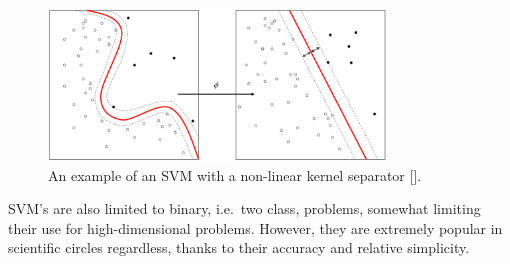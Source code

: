 \begin{figure}
  \centering
  \includegraphics[width=0.8\textwidth]{figures/chapter2/svm_nonlinear}
  \caption[An example of an SVM with a non-linear kernel separator.]{An example of an SVM with a non-linear kernel separator [\cite{kernel-wiki-pic}].}
\label{fig:chap2-svm-nonlinear}
\end{figure}

SVM's are also limited to  binary, i.e.\ two class, problems, somewhat limiting their use for high-dimensional problems. However, they are extremely popular in scientific circles regardless,  thanks to their accuracy and relative simplicity. 
